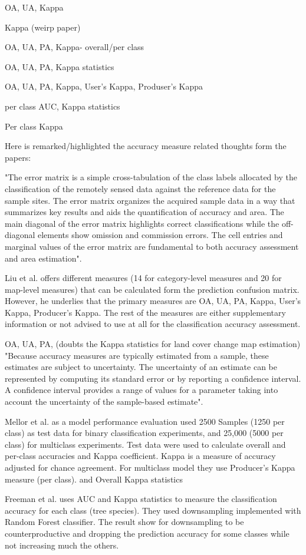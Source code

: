 \documentclass[parskip=full]{scrartcl}
\begin{document}
OA, UA, Kappa \cite{du2015}

Kappa (weirp paper) \cite{wang2018}

OA, UA, PA, Kappa- overall/per class \cite{foody2002}

OA, UA, PA, Kappa statistics  \cite{ji2018}

OA, UA, PA, Kappa, User's Kappa, Produser's Kappa \cite{liu2007}

per class AUC, Kappa statistics \cite{freeman2012}

Per class Kappa \cite{mellor2015}

Here is remarked/highlighted the accuracy measure related thoughts form the 
papers:

\cite{olofsson2014}
"The error matrix is a simple cross-tabulation of the class labels allocated 
by the classification of the remotely sensed data against the reference data for 
the sample sites. The error matrix organizes the acquired sample data in a way 
that summarizes key results and aids the quantification of accuracy and area. 
The main diagonal of the error matrix highlights correct classifications while 
the off-diagonal elements show omission and commission errors. The cell entries 
and marginal values of the error matrix are fundamental to both accuracy 
assessment and area estimation".

Liu et al. \cite{liu2007} offers different measures (14 for category-level measures 
and 20 for map-level measures) that can be calculated form the prediction confusion 
matrix. However, he underlies that the primary measures are OA, UA, PA, Kappa, 
User's Kappa, Producer's Kappa. The rest of the measures are either supplementary 
information or not advised to use at all for the classification accuracy assessment. 


OA, UA, PA, (doubts the Kappa statistics for land cover change map estimation) 
\cite{olofsson2013}
"Because accuracy measures are typically estimated from a sample, these 
estimates are subject to uncertainty. The uncertainty of an estimate can be 
represented by computing its standard error or by reporting a confidence interval. 
A confidence interval provides a range of values for a parameter taking into 
account the uncertainty of the sample-based estimate".


Mellor et al. \cite{mellor2015} as a model performance evaluation used 2500 
Samples (1250 per class) as test data for binary classification experiments, 
and 25,000 (5000 per class) for multiclass experiments. Test data were used to 
calculate overall and per-class accuracies and Kappa coefficient. Kappa is a 
measure of accuracy adjusted for chance agreement. For multiclass model 
they use Producer's Kappa measure (per class). and Overall Kappa statistics

Freeman et al. \cite{freeman2012} uses AUC and Kappa statistics to measure the 
classification accuracy for each class (tree species). They used downsampling 
implemented with Random Forest classifier. The result show for downsampling 
to be counterproductive and dropping the prediction accuracy for some classes 
while not increasing much the others.





\end{document}
